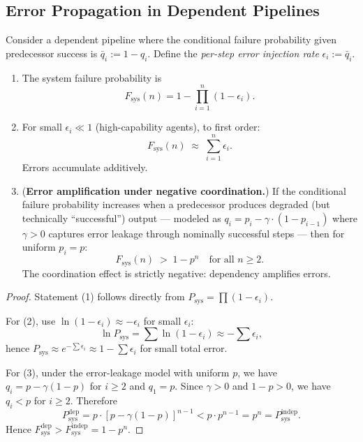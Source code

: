 \subsection{Error Propagation in Dependent Pipelines}

\begin{theorem}
\label{thm:error-propagation}
Consider a dependent pipeline where the conditional failure probability given predecessor
success is $\bar{q}_i := 1 - q_i$. Define the \emph{per-step error injection rate}
$\epsilon_i := \bar{q}_i$.
\begin{enumerate}
  \item The system failure probability is
  \[
    F_{\mathrm{sys}}(n) = 1 - \prod_{i=1}^{n}(1 - \epsilon_i).
  \]

  \item For small $\epsilon_i \ll 1$ (high-capability agents), to first order:
  \[
    F_{\mathrm{sys}}(n) \;\approx\; \sum_{i=1}^{n} \epsilon_i.
  \]
  Errors accumulate additively.

  \item (\textbf{Error amplification under negative coordination.})
  If the conditional failure probability increases when a predecessor
  produces degraded (but technically ``successful'') output --- modeled as
  $q_i = p_i - \gamma \cdot (1 - p_{i-1})$ where $\gamma > 0$ captures error leakage
  through nominally successful steps --- then for uniform $p_i = p$:
  \[
    F_{\mathrm{sys}}(n) \;>\; 1 - p^n \quad \text{for all } n \geq 2.
  \]
  The coordination effect is strictly negative: dependency amplifies errors.
\end{enumerate}
\end{theorem}

\begin{proof}
Statement (1) follows directly from $P_{\mathrm{sys}} = \prod(1 - \epsilon_i)$.

For (2), use $\ln(1 - \epsilon_i) \approx -\epsilon_i$ for small $\epsilon_i$:
\[
  \ln P_{\mathrm{sys}} = \sum \ln(1 - \epsilon_i) \approx -\sum \epsilon_i,
\]
hence $P_{\mathrm{sys}} \approx e^{-\sum \epsilon_i} \approx 1 - \sum \epsilon_i$ for small total error.

For (3), under the error-leakage model with uniform $p$, we have
$q_i = p - \gamma(1-p)$ for $i \geq 2$ and $q_1 = p$. Since $\gamma > 0$ and $1-p > 0$,
we have $q_i < p$ for $i \geq 2$. Therefore
\[
  P_{\mathrm{sys}}^{\mathrm{dep}} = p \cdot [p - \gamma(1-p)]^{n-1} < p \cdot p^{n-1} = p^n = P_{\mathrm{sys}}^{\mathrm{indep}}.
\]
Hence $F_{\mathrm{sys}}^{\mathrm{dep}} > F_{\mathrm{sys}}^{\mathrm{indep}} = 1 - p^n$.
\end{proof}

